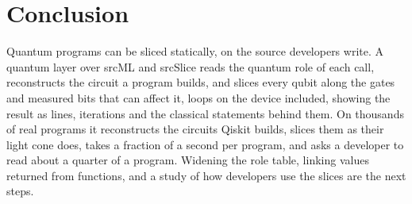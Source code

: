 \section{Conclusion}\label{sec:b-conclusion}

Quantum programs can be sliced statically, on the source developers write. A quantum layer over srcML and srcSlice
reads the quantum role of each call, reconstructs the circuit a program builds, and slices every qubit along the gates
and measured bits that can affect it, loops on the device included, showing the result as lines, iterations and the
classical statements behind them. On thousands of real programs it reconstructs the circuits Qiskit builds, slices them
as their light cone does, takes a fraction of a second per program, and asks a developer to read about a quarter of a
program. Widening the role table, linking values returned from functions, and a study of how developers use the slices
are the next steps.

